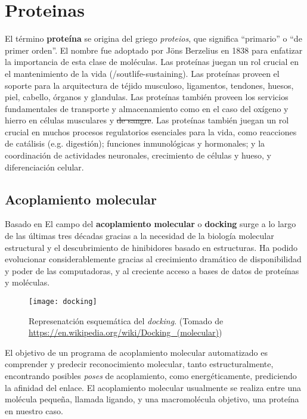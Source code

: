 \section{Proteinas}
\cite{tamar}
El término \textbf{proteína} se origina del griego \textit{proteios},
que significa ``primario'' o ``de primer orden''. El nombre fue
adoptado por Jöns Berzelius en 1838 para enfatizar la importancia de
esta clase de moléculas. Las proteínas juegan un rol crucial en el
mantenimiento de la vida (/sout{life-sustaining}). Las proteínas
proveen el soporte para la arquitectura de téjido musculoso,
ligamentos, tendones, huesos, piel, cabello, órganos y glandulas. Las
proteínas también proveen los servicios fundamentales de transporte y
almacenamiento como en el caso del oxígeno y hierro en células
musculares y \sout{de sangre}. Las proteínas también juegan un rol
crucial en muchos procesos regulatorios esenciales para la vida, como
reacciones de catálisis (e.g. digestión); funciones inmunológicas y
hormonales;  y la coordinación de actividades neuronales, crecimiento
de células y hueso, y diferenciación celular.

\subsection{Acoplamiento molecular}
Basado en \cite{kukol}
El campo del \textbf{acoplamiento molecular} o \textbf{docking}
surge a lo largo de las últimas tres décadas gracias a la necesidad de la
biología molecular estructural y el descubrimiento de hinibidores basado
en estructuras. Ha podido evolucionar considerablemente gracias al
crecimiento dramático de disponibilidad y poder de las computadoras, y
al creciente acceso a bases de datos de proteínas y moléculas.

\begin{figure}[h]
  \texttt{[image: docking]}
  \centering
  \caption{Represenatción esquemática del \textit{docking}.
    (Tomado de \url{https://en.wikipedia.org/wiki/Docking_(molecular)})}
\end{figure}

El objetivo de un programa de acoplamiento molecular automatizado es
comprender y predecir reconocimiento molecular, tanto
estructuralmente, encontrando posibles \textit{poses} de acoplamiento,
como energéticamente, prediciendo la afinidad del enlace. El
acoplamiento molecular usualmente se realiza entre una molécula
pequeña, llamada ligando, y una macromolécula objetivo, una proteína
en nuestro caso. 

